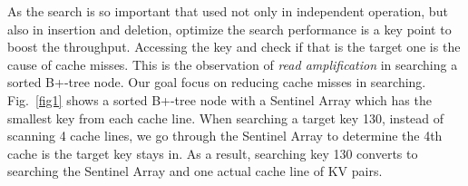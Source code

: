 As the search is so important that used not only in independent operation, but also in insertion and deletion, optimize the search performance is a key point to boost the throughput. Accessing the key and check if that is the target one is the cause of cache misses. This is the observation of {\em read amplification} in searching a sorted B+-tree node. Our goal focus on reducing cache misses in searching. Fig.~\ref{fig1} shows a sorted B+-tree node with a Sentinel Array which has the smallest key from each cache line. When searching a target key 130, instead of scanning 4 cache lines, we go through the Sentinel Array to determine the 4th cache is the target key stays in. As a result, searching key 130 converts to searching the Sentinel Array and one actual cache line of KV pairs.

